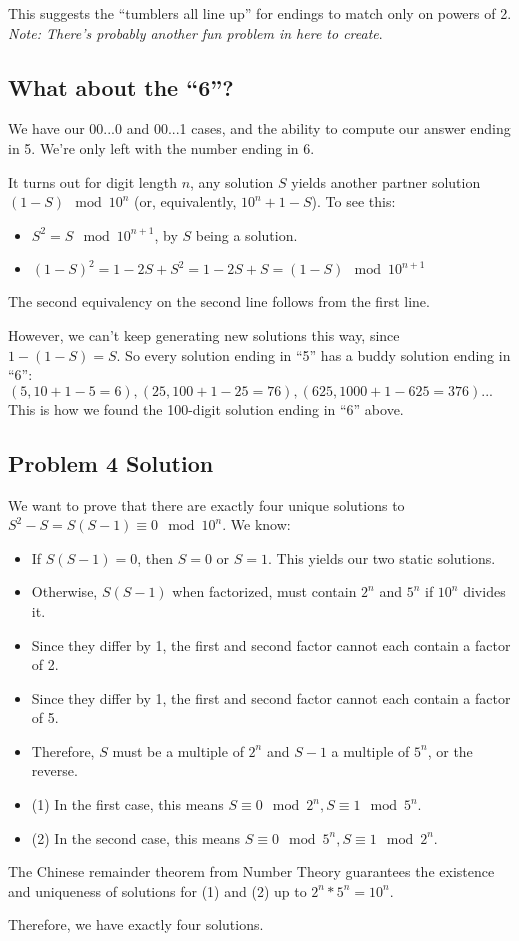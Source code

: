 \documentclass[11pt, oneside]{article} 	%
\begin{document}
This suggests the ``tumblers all line up'' for endings to match only on powers of 2.  \emph{Note: There's probably another fun problem in here to create}.

\subsection{What about the ``6''?}

We have our 00...0 and 00...1 cases, and the ability to compute our answer ending in 5.  We're only left with the number ending in 6.

It turns out for digit length $n$, any solution $S$ yields another partner solution $(1 - S) \mod 10^n$ (or, equivalently, $10^n + 1 - S$).  To see this:

\begin{itemize}
\item $S^2 = S  \mod 10^{n+1}$, by $S$ being a solution.
\item $(1-S)^2 = 1-2S+S^2 = 1-2S+S = (1-S) \mod 10^{n+1}$
\end{itemize}

The second equivalency on the second line follows from the first line.

However, we can't keep generating new solutions this way, since $1 - (1 - S) = S$.  So every solution ending in ``5'' has a buddy solution ending in ``6'': $(5, 10 + 1 - 5 = 6), (25, 100 + 1 - 25 = 76), (625, 1000 +1 - 625 = 376)...$ This is how we found the 100-digit solution ending in ``6'' above.

\subsection{Problem 4 Solution}

We want to prove that there are exactly four unique solutions to $S^2 - S = S(S-1) \equiv 0 \mod 10^n$.  We know:

\begin{itemize}
\item If $S(S-1) = 0$, then $S = 0$ or $S = 1$.  This yields our two static solutions.
\item Otherwise, $S(S-1)$ when factorized, must contain $2^n$ and $5^n$ if $10^n$ divides it.
\item Since they differ by 1, the first and second factor cannot each contain a factor of 2.
\item  Since they differ by 1, the first and second factor cannot each contain a factor of 5.
\item Therefore, $S$ must be a multiple of $2^n$ and $S-1$ a multiple of $5^n$, or the reverse.
\item (1) In the first case, this means $S \equiv 0 \mod 2^n, S \equiv 1 \mod 5^n$.
\item (2) In the second case, this means $S \equiv 0 \mod 5^n, S \equiv 1 \mod 2^n$.
\end{itemize}

The Chinese remainder theorem from Number Theory guarantees the existence and uniqueness of solutions for (1) and (2) up to $2^n*5^n = 10^n$.

Therefore, we have exactly four solutions.
\end{document}
